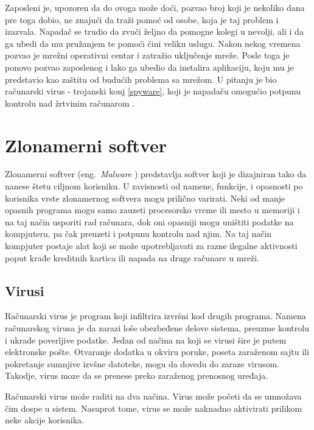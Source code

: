 \documentclass[a4paper]{article}
\begin{document}
Zaposleni je, upozoren da do ovoga može doći, pozvao broj koji je nekoliko dana pre toga dobio, ne znajući da traži pomoć od osobe, koja je taj problem i izazvala. Napadač se trudio da zvuči željno da pomogne kolegi u nevolji, ali i da ga ubedi da mu pružanjem te pomoći čini veliku uslugu. Nakon nekog vremena pozvao je mrežni operativni centar i zatražio uključenje mreže. Posle toga je ponovo pozvao zaposlenog i lako ga ubedio da instalira aplikaciju, koju mu je predstavio kao zaštitu od budućih problema sa mrežom. U pitanju je bio računarski virus - trojanski konj \ref{spyware}, koji je napadaču omogućio potpunu kontrolu nad žrtvinim računarom \cite{deception}.

\section{Zlonamerni softver}

Zlonamerni softver (eng.~{\em Malware }) predstavlja softver koji je dizajniran tako da nanese štetu ciljnom korisniku. U zavisnosti od namene, funkcije, i opasnosti po korisnika vrste zlonamernog softvera mogu prilično varirati. Neki od manje opasnih programa mogu samo zauzeti procesorsko vreme ili mesto u memoriji i na taj način usporiti rad računara, dok oni opasniji mogu uništiti podatke na kompjuteru, pa čak preuzeti i potpunu kontrolu nad njim. Na taj način kompjuter postaje alat koji se može upotrebljavati za razne ilegalne aktivnosti poput krađe kreditnih kartica ili napada na druge računare u mreži. \cite{ethics}


\subsection{Virusi}
\label{sec:malware}

Računarski virus je program koji infiltrira izvršni kod drugih programa. Namena računarskog virusa je da zarazi loše obezbeđene delove sistema, preuzme kontrolu i ukrade poverljive podatke. Jedan od načina na koji se virusi šire je putem elektronske pošte.
Otvaranje dodatka u okviru poruke, poseta zaraženom sajtu ili pokretanje sumnjive izvšne datoteke, mogu da dovedu do zaraze virusom. Takodje, virus moze da se prenese preko zaraženog prenosnog uređaja.\cite{viruses_and_worms,computer_virus}

Računarski virus može raditi na dva načina.
Virus može početi da se umnožava čim dospe u sistem. Nasuprot tome,
virus se može naknadno aktivirati prilikom neke akcije korisnika.
\end{document}
